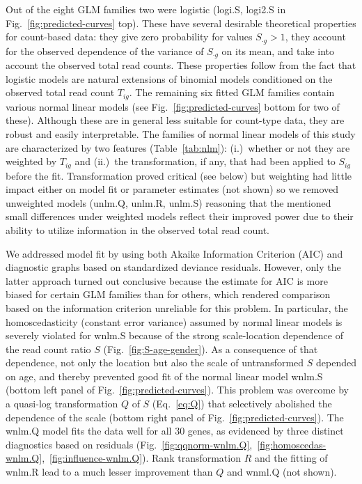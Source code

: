 \documentclass[letterpaper]{article}
\begin{document}
Out of the eight GLM families two were logistic (logi.S, logi2.S in
Fig.~\ref{fig:predicted-curves} top).  These have several desirable
theoretical properties for count-based data: they give zero probability for
values \(S_{\cdot g}>1\), they account for the observed dependence of the
variance of \(S_{\cdot g}\) on its mean, and take into account the observed
total read counts.  These properties follow from the fact that logistic models
are natural extensions of binomial models conditioned on the observed total
read count \(T_{ig}\).  The remaining six fitted GLM families contain various
normal linear models (see Fig.~\ref{fig:predicted-curves} bottom for two of
these).  Although these are in general less suitable for count-type data, they
are robust and easily interpretable. The families of normal linear models of
this study are characterized by two features (Table~\ref{tab:nlm}):
(i.)~whether or not they are weighted by \(T_{ig}\) and (ii.)~the
transformation, if any, that had been applied to \(S_{ig}\) before the fit.
Transformation proved critical (see below) but weighting had little impact
either on model fit or parameter estimates (not shown) so we removed
unweighted models (unlm.Q, unlm.R, unlm.S) reasoning that the mentioned small
differences under weighted models reflect their improved power due to their
ability to utilize information in the observed total read count.

We addressed model fit by using both Akaike Information Criterion (AIC) and
diagnostic graphs based on standardized deviance residuals.  However, only the
latter approach turned out conclusive because the estimate for AIC is more
biased for certain GLM families than for others, which rendered comparison
based on the information criterion unreliable for this problem.  In
particular, the homoscedasticity (constant error variance) assumed by normal
linear models is severely violated for wnlm.S because of the strong
scale-location dependence of the read count ratio \(S\)
(Fig.~\ref{fig:S-age-gender}).  As a consequence of that dependence, not only
the location but also the scale of untransformed \(S\) depended on age, and
thereby prevented good fit of the normal linear model wnlm.S (bottom left
panel of Fig.~\ref{fig:predicted-curves}).  This problem was overcome by a
quasi-log transformation \(Q\) of \(S\) (Eq.~\ref{eq:Q}) that selectively
abolished the dependence of the scale (bottom right panel of
Fig.~\ref{fig:predicted-curves}).  The wnlm.Q model fits the data well for all
30 genes, as evidenced by three distinct diagnostics based on residuals
(Fig.~\ref{fig:qqnorm-wnlm.Q},~\ref{fig:homoscedas-wnlm.Q},~\ref{fig:influence-wnlm.Q}).
Rank transformation \(R\) and the fitting of wnlm.R lead to a much lesser
improvement than \(Q\) and wnml.Q (not shown).
\end{document}
